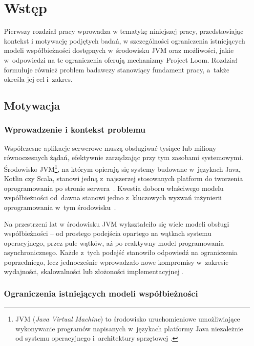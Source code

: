 \chapter{Wstęp}

Pierwszy rozdział pracy wprowadza w tematykę niniejszej pracy, przedstawiając kontekst i motywację podjętych badań, w szczególności ograniczenia istniejących modeli współbieżności dostępnych w~środowisku JVM oraz możliwości, jakie w~odpowiedzi na te ograniczenia oferują mechanizmy Project Loom. Rozdział formułuje również problem badawczy stanowiący fundament pracy, a~także określa jej cel i~zakres.

\section{Motywacja}

\subsection{Wprowadzenie i kontekst problemu}

Współczesne aplikacje serwerowe muszą obsługiwać tysiące lub miliony równoczesnych żądań, efektywnie zarządzając przy tym zasobami systemowymi. Środowisko JVM\footnote{JVM (\emph{Java Virtual Machine}) to środowisko uruchomieniowe umożliwiające wykonywanie programów napisanych w~językach platformy Java niezależnie od systemu operacyjnego i~architektury sprzętowej \cite{jvm-spec}.}, na którym opierają się systemy budowane w~językach Java, Kotlin czy Scala, stanowi jedną z~najszerzej stosowanych platform do tworzenia oprogramowania po stronie serwera~\cite{stackoverflow-survey-2025}. Kwestia doboru właściwego modelu współbieżności od~dawna stanowi jedno z~kluczowych wyzwań inżynierii oprogramowania w~tym środowisku~\cite{tanenbaum2023,goetz2006}.

Na przestrzeni lat w środowisku JVM wykształciło się wiele modeli obsługi współbieżności -- od prostego podejścia opartego na wątkach systemu operacyjnego, przez pule wątków, aż po reaktywny model programowania asynchronicznego. Każde z~tych podejść stanowiło odpowiedź na ograniczenia poprzedniego, lecz jednocześnie wprowadzało nowe kompromisy w~zakresie wydajności, skalowalności lub złożoności implementacyjnej \cite{goetz2006,davis2019}.

\subsection{Ograniczenia istniejących modeli współbieżności}

